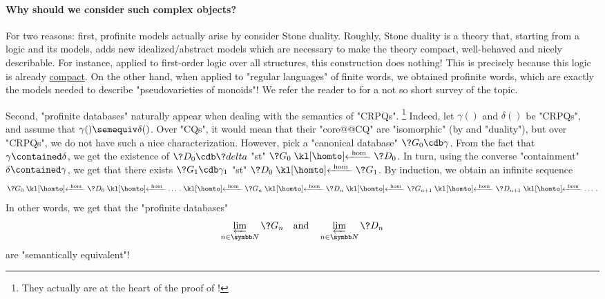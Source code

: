 \paragraph{Why should we consider such complex objects?}
For two reasons: first, profinite models actually arise
by consider Stone duality. Roughly, Stone duality is a theory that,
starting from a logic and its models, adds new idealized/abstract models which
are necessary to make the theory compact, well-behaved and nicely describable.
For instance, applied to first-order logic over all structures,
this construction does nothing! This is precisely because this logic is already
\href{https://en.wikipedia.org/wiki/Compactness\_theorem}{compact}.
On the other hand, when applied to "regular languages" of finite words,
we obtained profinite words, which are exactly the models needed to describe
"pseudovarieties of monoids"! We refer the reader to \cite{GehrkeGool2024Topological}
for a not so short survey of the topic.

Second, "profinite databases" naturally appear when dealing with the semantics
of "CRPQs".%
\footnote{They actually are at the heart of
the proof of !}
Indeed, let $\gamma()$ and $\delta()$ be "CRPQs",
and assume that $\gamma() \semequiv \delta()$. Over "CQs", it would mean that
their "core@@CQ" are "isomorphic" (by  and "duality"),
but over "CRPQs", we do not have such a nice characterization.
However, pick a "canonical database" $\?G_0 \cdb \gamma$. From the
fact that $\gamma \contained \delta$, we get the existence of $\?D_0 \cdb \?delta$
"st" $\?G_0 \cohomto \?D_0$. In turn, using the converse "containment" $\delta \contained \gamma$,
we get that there exists $\?G_1 \cdb \gamma_1$ "st" $\?D_0 \cohomto \?G_1$. By induction,
we obtain an infinite sequence
\[
	\?G_0 \cohomto \?D_0 \cohomto \dotsc. \cohomto \?G_n \cohomto \?D_n \cohomto
	\?G_{n+1} \cohomto \?D_{n+1} \cohomto \dotsc.
\]
In other words, we get that the "profinite databases"
\[\varprojlim_{n\in\N} \?G_{n}
\quad\text{and}\quad
\varprojlim_{n\in\N} \?D_{n}\]
are "semantically equivalent"!


